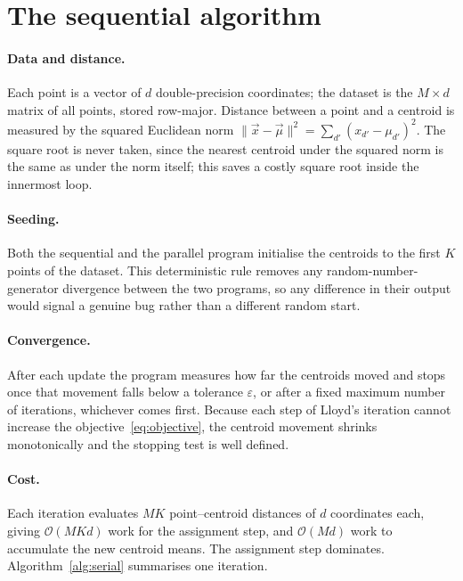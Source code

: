 \documentclass[11pt,a4paper]{article}
\begin{document}
\section{The sequential algorithm}
\label{sec:serial}

\paragraph{Data and distance.}
Each point is a vector of $d$ double-precision coordinates; the dataset is the
$M\times d$ matrix of all points, stored row-major. Distance between a point and
a centroid is measured by the squared Euclidean norm
$\lVert\vec x-\vec\mu\rVert^2=\sum_{d'} (x_{d'}-\mu_{d'})^2$. The square root is
never taken, since the nearest centroid under the squared norm is the same as
under the norm itself; this saves a costly square root inside the innermost
loop.

\paragraph{Seeding.}
Both the sequential and the parallel program initialise the centroids to the
first $K$ points of the dataset. This deterministic rule removes any
random-number-generator divergence between the two programs, so any difference
in their output would signal a genuine bug rather than a different random start.

\paragraph{Convergence.}
After each update the program measures how far the centroids moved and stops once
that movement falls below a tolerance $\varepsilon$, or after a fixed maximum
number of iterations, whichever comes first. Because each step of Lloyd's
iteration cannot increase the objective~\eqref{eq:objective}, the centroid
movement shrinks monotonically and the stopping test is well defined.

\paragraph{Cost.}
Each iteration evaluates $M K$ point--centroid distances of $d$ coordinates
each, giving $\mathcal{O}(M K d)$ work for the assignment step, and
$\mathcal{O}(M d)$ work to accumulate the new centroid means. The assignment
step dominates. Algorithm~\ref{alg:serial} summarises one iteration.
\end{document}
